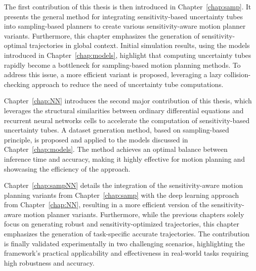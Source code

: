 The first contribution of this thesis is then introduced in Chapter~\ref{chap:samp}.
It presents the general method for integrating sensitivity-based uncertainty tubes into sampling-based planners to create various sensitivity-aware motion planner variants.
Furthermore, this chapter emphasizes the generation of sensitivity-optimal trajectories in global context.
Initial simulation results, using the models introduced in Chapter~\ref{chap:models}, highlight that computing uncertainty tubes rapidly become a bottleneck for sampling-based motion planning methods.
To address this issue, a more efficient variant is proposed, leveraging a lazy collision-checking approach to reduce the need of uncertainty tube computations.

Chapter~\ref{chap:NN} introduces the second major contribution of this thesis, which leverages the structural similarities between ordinary differential equations and recurrent neural networks cells to accelerate the computation of sensitivity-based uncertainty tubes. 
A dataset generation method, based on sampling-based principle, is proposed and applied to the models discussed in Chapter~\ref{chap:models}. 
The method achieves an optimal balance between inference time and accuracy, making it highly effective for motion planning and showcasing the efficiency of the approach.

Chapter~\ref{chap:sampNN} details the integration of the sensitivity-aware motion planning variants from Chapter~\ref{chap:samp} with the deep learning approach from Chapter~\ref{chap:NN}, resulting in a more efficient version of the sensitivity-aware motion planner variants.
Furthermore, while the previous chapters solely focus on generating robust and sensitivity-optimized trajectories, this chapter emphasizes the generation of task-specific accurate trajectories.
The contribution is finally validated experimentally in two challenging scenarios, highlighting the framework's practical applicability and effectiveness in real-world tasks requiring high robustness and accuracy.

